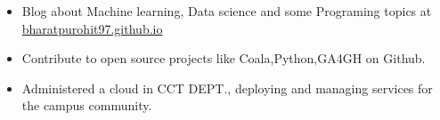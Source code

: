 \vspace{-0.2cm}


{\fontsize{11pt}{1em}\bodyfontlight\upshape\color{text}
\begin{itemize}
  \itemsep-0.3em
  \item Blog about Machine learning, Data science and some Programing topics at \href{https://bharatpurohit97.github.io}{bharatpurohit97.github.io}
  \item Contribute to open source projects like Coala,Python,GA4GH on Github.
  \item Administered a cloud in CCT DEPT., deploying and managing services for the campus community.
\end{itemize}
}

